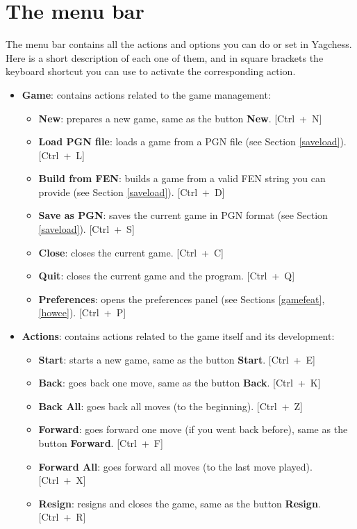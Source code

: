 \documentclass[a4paper]{article}
\newcommand{\nameprog}{Yagchess}
\begin{document}
\section{The menu bar}
\label{menu}
The menu bar contains all the actions and options you can do or set in \nameprog. Here is a short description of each one of them, and
in square brackets the keyboard shortcut you can use to activate the corresponding action.

\begin{itemize}
\item \textbf{Game}: contains actions related to the game management:
\begin{itemize}
\item \textbf{New}: prepares a new game, same as the button \textbf{New}. \mbox{[Ctrl + N]}
\item \textbf{Load PGN file}: loads a game from a PGN file (see Section \ref{saveload}). \mbox{[Ctrl + L]}
\item \textbf{Build from FEN}: builds a game from a valid FEN string you can provide (see Section \ref{saveload}). \mbox{[Ctrl + D]}
\item \textbf{Save as PGN}: saves the current game in PGN format (see Section \ref{saveload}). \mbox{[Ctrl + S]}
\item \textbf{Close}: closes the current game. \mbox{[Ctrl + C]}
\item \textbf{Quit}: closes the current game and the program. \mbox{[Ctrl + Q]}
\item \textbf{Preferences}: opens the preferences panel (see Sections \ref{gamefeat}, \ref{howce}). \mbox{[Ctrl + P]}
\end{itemize}

\item \textbf{Actions}: contains actions related to the game itself and its development:
\begin{itemize}
\item \textbf{Start}: starts a new game, same as the button \textbf{Start}. \mbox{[Ctrl + E]}
\item \textbf{Back}: goes back one move, same as the button \textbf{Back}. \mbox{[Ctrl + K]}
\item \textbf{Back All}: goes back all moves (to the beginning). \mbox{[Ctrl + Z]}
\item \textbf{Forward}: goes forward one move (if you went back before), same as the button \textbf{Forward}. \mbox{[Ctrl + F]}
\item \textbf{Forward All}: goes forward all moves (to the last move played). \mbox{[Ctrl + X]}
\item \textbf{Resign}: resigns and closes the game, same as the button \textbf{Resign}. \mbox{[Ctrl + R]}
\end{itemize}


\end{itemize}
\end{document}
